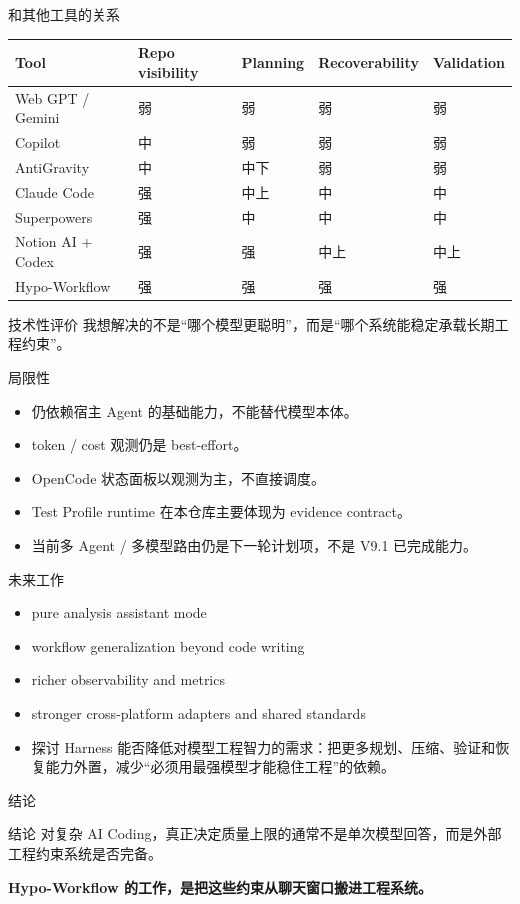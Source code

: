 \documentclass[theme=workflow,aspectratio=169,fontset=tech]{Hypo-Slide}
\begin{document}
\begin{frame}{和其他工具的关系}
  \small
  \begin{tabularx}{\textwidth}{lXXXX}
    \toprule
    Tool & Repo visibility & Planning & Recoverability & Validation \\
    \midrule
    Web GPT / Gemini & 弱 & 弱 & 弱 & 弱 \\
    Copilot & 中 & 弱 & 弱 & 弱 \\
    AntiGravity & 中 & 中下 & 弱 & 弱 \\
    Claude Code & 强 & 中上 & 中 & 中 \\
    Superpowers & 强 & 中 & 中 & 中 \\
    Notion AI + Codex & 强 & 强 & 中上 & 中上 \\
    Hypo-Workflow & 强 & 强 & 强 & 强 \\
    \bottomrule
  \end{tabularx}
  \vspace{0.25cm}
  \begin{alertblock}{技术性评价}
    我想解决的不是“哪个模型更聪明”，而是“哪个系统能稳定承载长期工程约束”。
  \end{alertblock}
\end{frame}

\begin{frame}{局限性}
  \begin{itemize}
    \item 仍依赖宿主 Agent 的基础能力，不能替代模型本体。
    \item token / cost 观测仍是 best-effort。
    \item OpenCode 状态面板以观测为主，不直接调度。
    \item Test Profile runtime 在本仓库主要体现为 evidence contract。
    \item 当前多 Agent / 多模型路由仍是下一轮计划项，不是 V9.1 已完成能力。
  \end{itemize}
\end{frame}

\begin{frame}{未来工作}
  \begin{itemize}
    \item pure analysis assistant mode
    \item workflow generalization beyond code writing
    \item richer observability and metrics
    \item stronger cross-platform adapters and shared standards
    \item 探讨 Harness 能否降低对模型工程智力的需求：把更多规划、压缩、验证和恢复能力外置，减少“必须用最强模型才能稳住工程”的依赖。
  \end{itemize}
\end{frame}

\begin{frame}{结论}
  \begin{block}{结论}
    对复杂 AI Coding，真正决定质量上限的通常不是单次模型回答，而是外部工程约束系统是否完备。
  \end{block}
  \vspace{0.6cm}
  \centering
  {\Large\bfseries\color{WorkflowBlue}Hypo-Workflow 的工作，是把这些约束从聊天窗口搬进工程系统。}
\end{frame}
\end{document}
